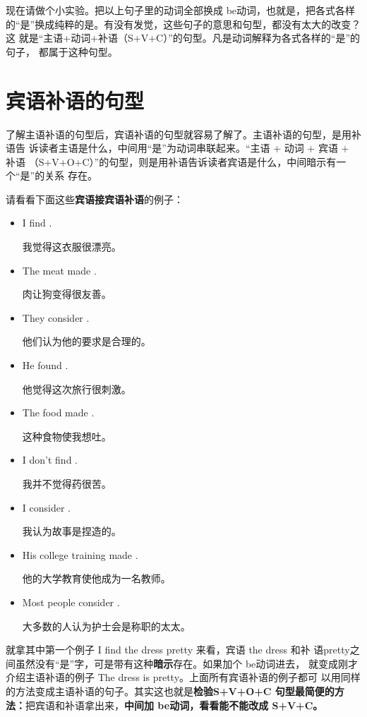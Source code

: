 现在请做个小实验。把以上句子里的动词全部换成 be动词，也就是，把各式各样
的“是”换成纯粹的是。有没有发觉，这些句子的意思和句型，都没有太大的改变？这
就是“主语+动词+补语（S+V+C）”的句型。凡是动词解释为各式各样的“是”的句子，
都属于这种句型。

\section{宾语补语的句型}

了解主语补语的句型后，宾语补语的句型就容易了解了。主语补语的句型，是用补语告
诉读者主语是什么，中间用“是”为动词串联起来。“主语 + 动词 + 宾语 + 补语
（S+V+O+C）”的句型，则是用补语告诉读者宾语是什么，中间暗示有一个“是”的关系
存在。

请看看下面这些\textbf{宾语接宾语补语}的例子：

\begin{itemize}
\item  I find .

  我觉得这衣服很漂亮。
\item  The meat made .

  肉让狗变得很友善。
\item  They consider .

  他们认为他的要求是合理的。
\item  He found .

  他觉得这次旅行很刺激。
\item  The food made .

  这种食物使我想吐。
\item  I don't find .

  我并不觉得药很苦。
\item  I consider .

  我认为故事是捏造的。
\item  His college training made .

  他的大学教育使他成为一名教师。
\item  Most people consider .

  大多数的人认为护士会是称职的太太。
\end{itemize}

就拿其中第一个例子 I find the dress pretty 来看，宾语 the dress 和补
语pretty之间虽然没有“是”字，可是带有这种\textbf{暗示}存在。如果加个 be动词进去，
就变成刚才介绍主语补语的例子 The dress is pretty。上面所有宾语补语的例子都可
以用同样的方法变成主语补语的句子。其实这也就是\textbf{检验S+V+O+C 句型最简便的方
  法：}把宾语和补语拿出来，\textbf{中间加 be动词，看看能不能改成 S+V+C。}

